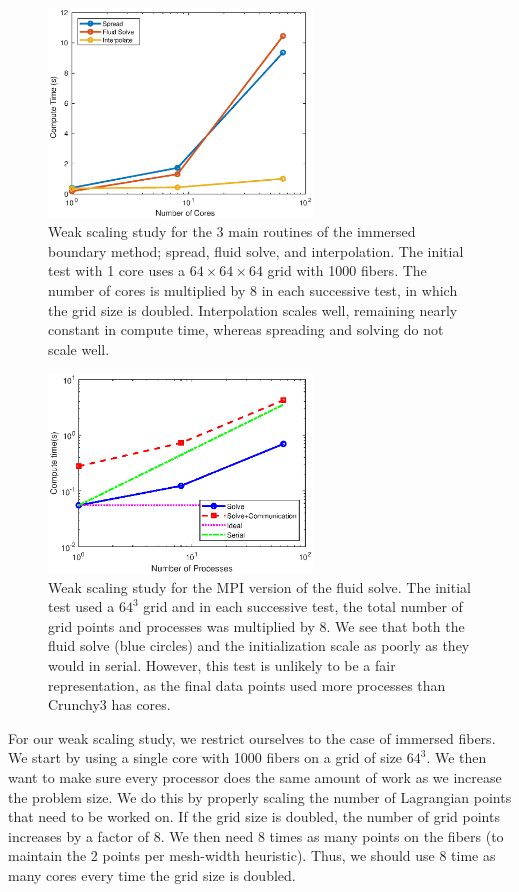 \documentclass[]{article}
\begin{document}
\begin{figure}
	\centering     
	\includegraphics[width=70mm]{WeakScFibers.eps}
\caption{Weak scaling study for the 3 main routines of the immersed boundary method; spread, fluid solve, and interpolation. The initial test with 1 core uses a $64\times64\times64$ grid with 1000 fibers.  The number of cores is multiplied by $8$ in each successive test, in which the grid size is doubled. Interpolation scales well, remaining nearly constant in compute time, whereas spreading and solving do not scale well.}
\label{fig:Weak}
\end{figure}
\begin{figure}
	\centering     
	\includegraphics[width=70mm]{WeakMPI.eps}
\caption{Weak scaling study for the MPI version of the fluid solve. The initial test used a $64^3$ grid and in each successive test, the total number of grid points and processes was multiplied by 8. We see that both the fluid solve (blue circles) and the initialization scale as poorly as they would in serial. However, this test is unlikely to be a fair representation, as the final data points used more processes than Crunchy3 has cores.}
\label{fig:WeakMPI}
\end{figure}
For our weak scaling study, we restrict ourselves to the case of immersed fibers. We start by using a single core with 1000 fibers on a grid of size $64^3$. We then want to make sure every processor does the same amount of work as we increase the problem size. We do this by properly scaling the number of Lagrangian points that need to be worked on. If the grid size is doubled, the number of grid points increases by a factor of 8. We then need $8$ times as many points on the fibers (to maintain the $2$ points per mesh-width heuristic). Thus, we should use $8$ time as many cores every time the grid size is doubled. 
\end{document}
